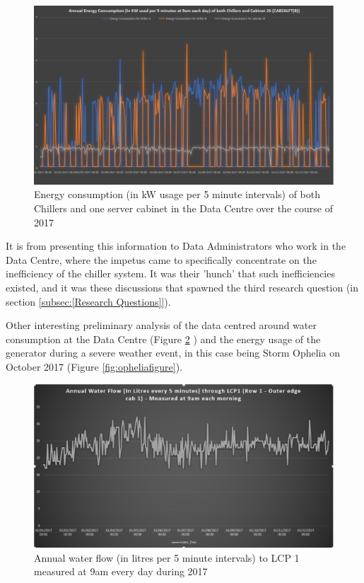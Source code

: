 \documentclass[12pt]{scrartcl}
\begin{document}
\begin{figure}[H]
  \caption{Energy consumption (in kW usage per 5 minute intervals) of both Chillers and one server cabinet in the Data Centre over the course of 2017}
  \label{fig:cabvchillerfigure}
  \centering
    \includegraphics[scale=0.45]{Energy_consumption_of_cab26_and_chillers}
\end{figure} 

It is from presenting this information to Data Administrators who work in the Data Centre, where the impetus came to specifically concentrate on the inefficiency of the chiller system. It was their 'hunch' that such inefficiencies existed, and it was these discussions that spawned the third research question (in section \ref{subsec:[Research Questions]}).   

Other interesting preliminary analysis of the data centred around water consumption at the Data Centre (Figure \ref{fig:annualwaterfigure} ) and the energy usage of the generator during a severe weather event, in this case being Storm Ophelia on October 2017 (Figure \ref{fig:opheliafigure}). 

\begin{figure}[H]
  \caption{Annual water flow (in litres per 5 minute intervals) to LCP 1 measured at 9am every day during 2017}
  \label{fig:annualwaterfigure}
  \centering
    \includegraphics[scale=0.45]{Annual_Water_Flow}
\end{figure} 
\end{document}
